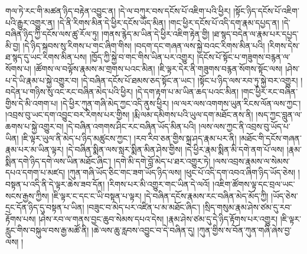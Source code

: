 གལ་ཏེ་རང་གི་མཚན་ཉིད་བརྟེན་འབྱུང་ན། །དེ་ལ་བཀུར་བས་དངོས་པོ་འཇིག་པའི་ཕྱིར། །སྟོང་ཉིད་དངོས་པོ་འཇིག་པའི་རྒྱུར་འགྱུར་ན། །དེ་ནི་རིགས་མིན་དེ་ཕྱིར་དངོས་ཡོད་མིན། །གང་ཕྱིར་དངོས་པོ་འདི་དག་རྣམ་དཔྱད་ན། །དེ་བཞིན་ཉིད་ཀྱི་དངོས་ལས་ཚུ་རོལ་ཏུ། །གནས་རྙེད་མ་ཡིན་དེ་ཕྱིར་འཇིག་རྟེན་གྱི། །ཐ་སྙད་བདེན་ལ་རྣམ་པར་དཔྱད་མི་བྱ། །དེ་ཉིད་སྐབས་སུ་རིགས་པ་གང་ཞིག་གིས། །བདག་དང་གཞན་ལས་སྐྱེ་བའང་རིགས་མིན་པའི། །རིགས་དེས་ཐ་སྙད་དུ་ཡང་རིགས་མིན་པས། །ཁྱོད་ཀྱི་སྐྱེ་བ་གང་གིས་ཡིན་པར་འགྱུར། །དངོས་པོ་སྟོང་པ་གཟུགས་བརྙན་ལ་སོགས་པ། །ཚོགས་ལ་བལྟོས་རྣམས་མ་གྲགས་པའང་མིན། །ཇི་ལྟར་དེར་ནི་གཟུགས་བརྙན་སོགས་སྟོང་ལས། །ཤེས་པ་དེ་ཡི་རྣམ་པ་སྐྱེ་འགྱུར་བ། །དེ་བཞིན་དངོས་པོ་ཐམས་ཅད་སྟོང་ན་ཡང་། །སྟོང་པ་ཉིད་ལས་རབ་ཏུ་སྐྱེ་བར་འགྱུར། །བདེན་པ་གཉིས་སུ་འང་རང་བཞིན་མེད་པའི་ཕྱིར། །དེ་དག་རྟག་པ་མ་ཡིན་ཆད་པའང་མིན། །གང་ཕྱིར་རང་བཞིན་གྱིས་དེ་མི་འགག་པ། །དེ་ཕྱིར་ཀུན་གཞི་མེད་ཀྱང་འདི་ནུས་ཕྱིར། །ལ་ལར་ལས་འགགས་ཡུན་རིངས་ལོན་ལས་ཀྱང་། །འབྲས་བུ་ཡང་དག་འབྱུང་བར་རིགས་པར་གྱིས། །རྨི་ལམ་དམིགས་པའི་ཡུལ་དག་མཐོང་ནས་ནི། །སད་ཀྱང་བླུན་ལ་ཆགས་པ་སྐྱེ་འགྱུར་བ། །དེ་བཞིན་འགགས་ཤིང་རང་བཞིན་ཡོད་མིན་པའི། །ལས་ལས་ཀྱང་ནི་འབྲས་བུ་ཡོད་པ་ཡིན། །ཇི་ལྟར་ཡུལ་ནི་མེད་པ་ཉིད་མཚུངས་ཀྱང་། །རབ་རིབ་ཅན་གྱིས་སྐྲ་ཤད་རྣམ་པར་ནི། །མཐོང་གི་དངོས་གཞན་རྣམ་པར་མ་ཡིན་ལྟར། །དེ་བཞིན་སྨིན་ལས་སླར་སྨིན་མིན་ཤེས་གྱིས། །དེ་ཕྱིར་རྣམ་སྨིན་མི་དགེ་ནག་པོ་ལས། །རྣམ་སྨིན་དགེ་ཉིད་དགེ་ལས་ཡིན་མཐོང་ཞིང་། །དགེ་མི་དགེ་བློ་མེད་པ་ཐར་འགྱུར་ཏེ། །ལས་འབྲས་རྣམས་ལ་སེམས་དཔའ་དགག་པ་མཛད། །ཀུན་གཞི་ཡོད་ཅིང་གང་ཟག་ཡོད་ཉིད་ལས། །ཕུང་པོ་འདི་དག་འབའ་ཞིག་ཉིད་ཡོད་ཅེས། །བསྟན་པ་འདི་ནི་དེ་ལྟར་ཆེས་ཟབ་དོན། །རིགས་པར་མི་འགྱུར་གང་ཡིན་དེ་ལའོ། །འཇིག་ཚོགས་ལྟ་དང་བྲལ་ཡང་སངས་རྒྱས་ཀྱིས། །ཇི་ལྟར་ང་དང་ང་ཡི་བསྟན་པ་ལྟར། །དེ་བཞིན་དངོས་རྣམས་རང་བཞིན་མེད་མོད་ཀྱི། །ཡོད་ཅེས་དྲང་དོན་ཉིད་དུ་བསྟན་པ་ཡིན། །བཟུང་བ་མེད་པར་འཛིན་པ་མ་མཐོང་ཞིང་། །སྲིད་གསུམ་རྣམ་ཤེས་ཙམ་དུ་རབ་རྟོགས་པས། །ཤེས་རབ་ལ་གནས་བྱང་ཆུབ་སེམས་དཔའ་དེས། །རྣམ་ཤེས་ཙམ་དུ་དེ་ཉིད་རྟོགས་པར་འགྱུར། །ཇི་ལྟར་རླུང་གིས་བསྐུལ་བས་རྒྱ་མཚོ་ནི། །ཆེ་ལས་ཆུ་རླབས་འབྱུང་བ་དེ་བཞིན་དུ། །ཀུན་གྱིས་ས་བོན་ཀུན་གཞི་ཞེས་བྱ་ལས། །
